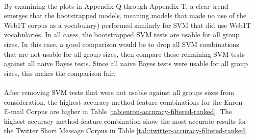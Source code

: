 	\paragraph*{} By examining the plots in Appendix Q through Appendix T, a clear trend emerges that the bootstrapped models, meaning models that made no use of the Web1T corpus as a vocabulary) performed similarly for SVM that did use Web1T vocabularies.  In all cases, the bootstrapped SVM tests are usable for all group sizes.  In this case, a good comparison would be to drop all SVM combinations that are not usable for all group sizes, then compare these remaining SVM tests against all naive Bayes tests.  Since all naive Bayes tests were usable for all group sizes, this makes the comparison fair.
	
	\paragraph*{} After removing SVM tests that were not usable against all groups sizes from consideration, the highest accuracy method-feature combinations for the Enron E-mail Corpus are higher in Table \ref{tab:enron-accuracy-filtered-ranked}.  The highest accuracy method-feature combination show the most accurate results for the Twitter Short Message Corpus in Table \ref{tab:twitter-accuracy-filtered-ranked}.
	
